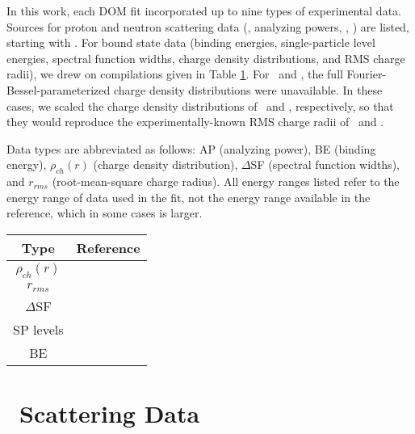 In this work, each DOM fit incorporated up to nine types of experimental data. Sources for proton
and neutron scattering data (\el, analyzing powers, \rxn, \tot) are listed, starting with \oSix.
For bound state data (binding energies, single-particle level energies, spectral function widths,
charge density distributions, and RMS charge radii), we drew on compilations given in Table
\ref{BoundStateData}. For \oEight\ and \snTwelve, the full Fourier-Bessel-parameterized charge
density distributions were unavailable. In these cases, we scaled the charge density distributions of \oSix\ and \snFour,
respectively, so that they would reproduce the experimentally-known RMS charge radii of
\oEight\ and \snTwelve.

Data types are abbreviated as follows: AP (analyzing power), BE (binding energy),
$\rho_{ch}(r)$ (charge density distribution), $\Delta$SF (spectral function widths), and
$r_{rms}$ (root-mean-square charge radius). All energy ranges listed refer to the energy range of 
data used in the fit, not the energy range available in the reference, which in some cases is larger.
\\
\begin{table}[htp]
    \label{BoundStateData}
    \centering
    \begin{tabular}{c  c} 
        \toprule
        \bf{Type} & \bf{Reference} \\
        \midrule
        $\rho_{ch}(r)$ & \cite{DeVries1987}\\
        $r_{rms}$ & \cite{DeVries1987}\\
        $\Delta$SF & \cite{Jacob1966, Jacob1973}\\
        SP levels & \cite{AME2016}\\
        BE & \cite{AME2016}\\
        \bottomrule
    \end{tabular}
\end{table}

\pagebreak
\section{\oSix\ Scattering Data}

\begin{table}[htp]
    \small
    \hspace*{\fill}%
    \begin{minipage}[t]{0.47\linewidth}
        \centering
        \vspace{0pt}
        
    \end{minipage}%
    \hfill
    \begin{minipage}[t]{0.47\linewidth}
        \centering
        \vspace{0pt}
        
    \end{minipage}
    \hspace*{\fill}
\end{table}

